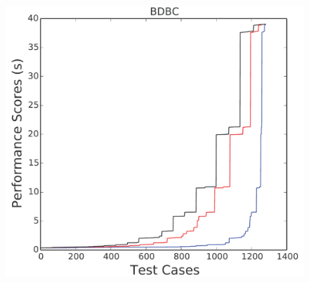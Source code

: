 \documentclass[conference]{IEEEtran}
\begin{document}
\begin{figure}[htbp!]
\begin{minipage}{0.30\linewidth}
\includegraphics[width=\linewidth]{_figs/BDBC.pdf}
\end{minipage}


\end{figure}
\end{document}
